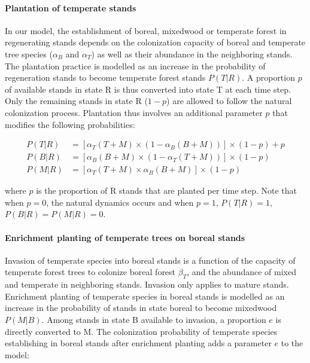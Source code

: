 \hypertarget{plantation-of-temperate-stands}{%
\paragraph{Plantation of temperate
stands}\label{plantation-of-temperate-stands}}

In our model, the establishment of boreal, mixedwood or temperate forest
in regenerating stands depends on the colonization capacity of boreal
and temperate tree species (\(\alpha_B\) and \(\alpha_T\)) as well as
their abundance in the neighboring stands. The plantation practice is
modelled as an increase in the probability of regeneration stands to
become temperate forest stands \(P(T|R)\). A proportion \(p\) of
available stands in state R is thus converted into state T at each time
step. Only the remaining stands in state R (\(1-p\)) are allowed to
follow the natural colonization process. Plantation thus involves an
additional parameter \(p\) that modifies the following probabilities:

\[
\begin{aligned}
  P(T|R) &= [\alpha_T (T+M) \times (1-\alpha_B (B+M))] \times (1 - p) +  p \\
  P(B|R) &= [\alpha_B (B+M) \times (1-\alpha_T (T+M))] \times (1 - p) \\
  P(M|R) &= [\alpha_T (T+M) \times \alpha_B (B+M)] \times (1 - p)
\end{aligned}
\]

where \(p\) is the proportion of R stands that are planted per time
step. Note that when \(p=0\), the natural dynamics occurs and when
\(p=1\), \(P(T|R)=1\), \(P(B|R)=P(M|R)=0\).

\hypertarget{enrichment-planting-of-temperate-trees-on-boreal-stands}{%
\paragraph{Enrichment planting of temperate trees on boreal
stands}\label{enrichment-planting-of-temperate-trees-on-boreal-stands}}

Invasion of temperate species into boreal stands is a function of the
capacity of temperate forest trees to colonize boreal forest
\(\beta_T\), and the abundance of mixed and temperate in neighboring
stands. Invasion only applies to mature stands. Enrichment planting of
temperate species in boreal stands is modelled as an increase in the
probability of stands in state boreal to become mixedwood \(P(M|B)\).
Among stands in state B available to invasion, a proportion \(e\) is
directly converted to M. The colonization probability of temperate
species establishing in boreal stands after enrichment planting adds a
parameter \(e\) to the model:

